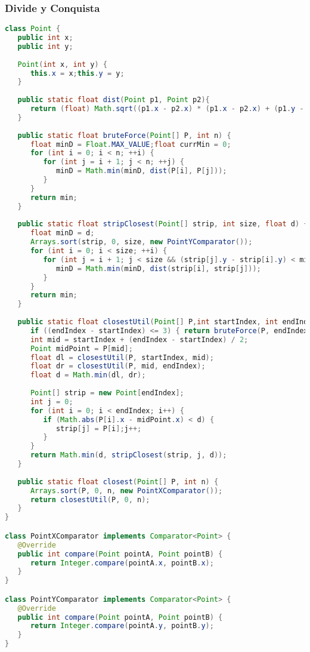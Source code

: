 \subsubsection{Divide y Conquista}
\begin{lstlisting}[language=Java]
class Point {
   public int x;
   public int y;
	
   Point(int x, int y) {
      this.x = x;this.y = y;
   }
	
   public static float dist(Point p1, Point p2){
      return (float) Math.sqrt((p1.x - p2.x) * (p1.x - p2.x) + (p1.y - p2.y) * (p1.y - p2.y));
   }
	
   public static float bruteForce(Point[] P, int n) {
      float minD = Float.MAX_VALUE;float currMin = 0;
      for (int i = 0; i < n; ++i) {
         for (int j = i + 1; j < n; ++j) {
            minD = Math.min(minD, dist(P[i], P[j]));
         }
      }
      return min;
   }
	
   public static float stripClosest(Point[] strip, int size, float d) {
      float minD = d;
      Arrays.sort(strip, 0, size, new PointYComparator());
      for (int i = 0; i < size; ++i) {
         for (int j = i + 1; j < size && (strip[j].y - strip[i].y) < min; ++j) {
            minD = Math.min(minD, dist(strip[i], strip[j]));
         }
      }
      return min;
   }
	
   public static float closestUtil(Point[] P,int startIndex, int endIndex){
      if ((endIndex - startIndex) <= 3) { return bruteForce(P, endIndex); }
      int mid = startIndex + (endIndex - startIndex) / 2;
      Point midPoint = P[mid];
      float dl = closestUtil(P, startIndex, mid);
      float dr = closestUtil(P, mid, endIndex);
      float d = Math.min(dl, dr);
		
      Point[] strip = new Point[endIndex];
      int j = 0;
      for (int i = 0; i < endIndex; i++) {
         if (Math.abs(P[i].x - midPoint.x) < d) {
            strip[j] = P[i];j++;
         }
      }
      return Math.min(d, stripClosest(strip, j, d));
   }
   
   public static float closest(Point[] P, int n) {
      Arrays.sort(P, 0, n, new PointXComparator());
      return closestUtil(P, 0, n);
   }
}

class PointXComparator implements Comparator<Point> {
   @Override
   public int compare(Point pointA, Point pointB) {
      return Integer.compare(pointA.x, pointB.x);
   }
}

class PointYComparator implements Comparator<Point> {
   @Override
   public int compare(Point pointA, Point pointB) {
      return Integer.compare(pointA.y, pointB.y);
   }	
}
\end{lstlisting}

